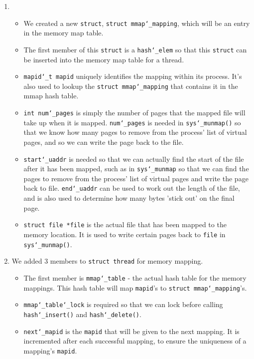 \documentclass{article}
\renewcommand{\_}{\char`_}
\begin{document}
\begin{enumerate}

\item

\begin{itemize}
\item
We created a new \texttt{struct}, \texttt{struct mmap\_mapping}, which will be an entry in the memory map table. 
\item
The first member of this \texttt{struct} is a \texttt{hash\_elem} so that this \texttt{struct} can be inserted into the memory map table for a thread.
\item
\texttt{mapid\_t mapid} uniquely identifies the mapping within its process. It's also used to lookup the \texttt{struct mmap\_mapping} that contains it in the mmap hash table. 
\item
\texttt{int num\_pages} is simply the number of pages that the mapped file will take up when it is mapped. \texttt{num\_pages} is needed in \texttt{sys\_munmap()} so that we know how many pages to remove from the process' list of virtual pages, and so we can write the page back to the file. 
\item
\texttt{start\_uaddr} is needed so that we can actually find the start of the file after it has been mapped, such as in \texttt{sys\_munmap} so that we can find the pages to remove from the process' list of virtual pages and write the page back to file. \texttt{end\_uaddr} can be used to work out the length of the file, and is also used to determine how many bytes 'stick out' on the final page.
\item
\texttt{struct file *file} is the actual file that has been mapped to the memory location. It is used to write certain pages back to \texttt{file} in \texttt{sys\_munmap()}.

\end{itemize}

\item

We added 3 members to \texttt{struct thread} for memory mapping. 

\begin{itemize}
\item
The first member is \texttt{mmap\_table} - the actual hash table for the memory mappings. This hash table will map \texttt{mapid}'s to \texttt{struct mmap\_mapping}'s.
\item
\texttt{mmap\_table\_lock} is required so that we can lock before calling \texttt{hash\_insert()} and \texttt{hash\_delete()}.
\item
\texttt{next\_mapid} is the \texttt{mapid} that will be given to the next mapping. It is incremented after each successful mapping, to ensure the uniqueness of a mapping's \texttt{mapid}.
\end{itemize}

\end{enumerate}
\end{document}
